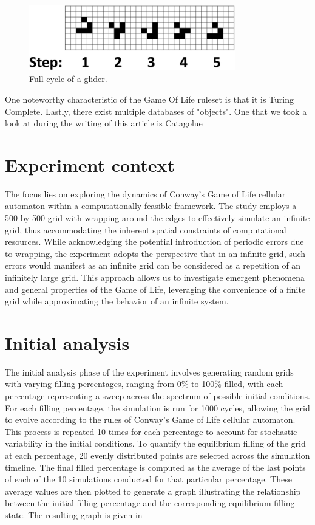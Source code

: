 \documentclass{article}
\begin{document}
\begin{figure}[htbp]
    \centering
    \includegraphics[width=0.8\textwidth]{res/glider.png}
    \caption{Full cycle of a glider\cite{graph}.}
    \label{fig:glider}
\end{figure}



One noteworthy characteristic of the Game Of Life ruleset is that it is Turing Complete.
Lastly, there exist multiple databases of "objects". One that we took a look at during the
writing of this article is Catagolue\cite{catagolue}

\section{Experiment context}
The focus lies on exploring the dynamics 
of Conway's Game of Life cellular automaton within a computationally 
feasible framework. The study employs a 500 by 500 grid with wrapping 
around the edges to effectively simulate an infinite grid, thus 
accommodating the inherent spatial constraints of computational 
resources. While acknowledging the potential introduction of periodic 
errors due to wrapping, the experiment adopts the perspective that in 
an infinite grid, such errors would manifest as an infinite grid can be considered as a repetition 
of an infinitely large grid. This approach allows us to 
investigate emergent phenomena and general properties of the Game of 
Life, leveraging the convenience of a finite grid while approximating 
the behavior of an infinite system. 


\section{Initial analysis}
The initial analysis phase of the experiment involves generating random 
grids with varying filling percentages, ranging from 0\% to 100\% filled, 
with each percentage representing a sweep across the spectrum of possible 
initial conditions. For each filling percentage, the simulation is run for 
1000 cycles, allowing the grid to evolve according to the rules of Conway's 
Game of Life cellular automaton. This process is repeated 10 times for 
each percentage to account for stochastic variability in the initial conditions. 
To quantify the equilibrium filling of the grid at each percentage, 20 evenly 
distributed points are selected across the simulation timeline. The final 
filled percentage is computed as the average of the last points of each of the 
10 simulations conducted for that particular percentage. These average values 
are then plotted to generate a graph illustrating the relationship between the 
initial filling percentage and the corresponding equilibrium filling state. The resulting 
graph is given in 
\end{document}
